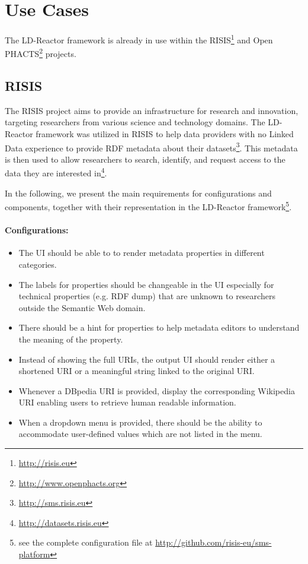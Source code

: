 \documentclass{llncs}
\begin{document}
\section{Use Cases}

The LD-Reactor framework is already in use within the RISIS\footnote{\url{http://risis.eu}} and Open PHACTS\footnote{\url{http://www.openphacts.org}} projects.

\subsection{RISIS}

The RISIS project aims to provide an infrastructure for research and innovation, targeting researchers from various science and technology domains.
The LD-Reactor framework was utilized in RISIS to help data providers with no Linked Data experience to provide RDF metadata about their datasets\footnote{\url{http://sms.risis.eu}}. This metadata is then used to allow researchers to search, identify, and request access to the data they are interested in\footnote{\url{http://datasets.risis.eu}}.

In the following, we present the main requirements for configurations and components, together with their representation in the LD-Reactor framework\footnote{see the complete configuration file at \url{http://github.com/risis-eu/sms-platform}}.

\paragraph{Configurations:}
\small
\begin{itemize}
 \item The UI should be able to to render metadata properties in different categories. %
 \item The labels for properties should be changeable in the UI especially for technical properties (e.g. RDF dump) that are unknown to researchers outside the Semantic Web domain.%
 \item There should be a hint for properties to help metadata editors to understand the meaning of the property.%
 \item Instead of showing the full URIs, the output UI should render either a shortened URI or a meaningful string linked to the original URI.%
 \item Whenever a DBpedia URI is provided, display the corresponding Wikipedia URI enabling users to retrieve human readable information.%
 \item When a dropdown menu is provided, there should be the ability to accommodate user-defined values which are not listed in the menu.%

\end{itemize}
\end{document}
